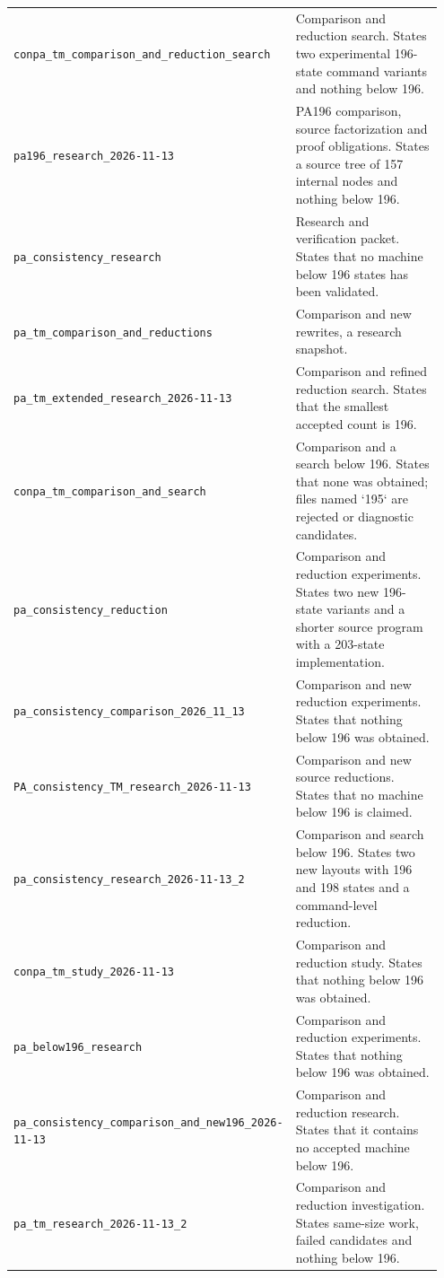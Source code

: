 \begin{longtable}{@{}p{0.40\linewidth}p{0.55\linewidth}@{}}
\nolinkurl{conpa_tm_comparison_and_reduction_search} & Comparison and reduction search. States two experimental 196-state command variants and nothing below 196.\\[4pt]
\nolinkurl{pa196_research_2026-11-13} & PA196 comparison, source factorization and proof obligations. States a source tree of 157 internal nodes and nothing below 196.\\[4pt]
\nolinkurl{pa_consistency_research} & Research and verification packet. States that no machine below 196 states has been validated.\\[4pt]
\nolinkurl{pa_tm_comparison_and_reductions} & Comparison and new rewrites, a research snapshot.\\[4pt]
\nolinkurl{pa_tm_extended_research_2026-11-13} & Comparison and refined reduction search. States that the smallest accepted count is 196.\\[4pt]
\nolinkurl{conpa_tm_comparison_and_search} & Comparison and a search below 196. States that none was obtained; files named `195` are rejected or diagnostic candidates.\\[4pt]
\nolinkurl{pa_consistency_reduction} & Comparison and reduction experiments. States two new 196-state variants and a shorter source program with a 203-state implementation.\\[4pt]
\nolinkurl{pa_consistency_comparison_2026_11_13} & Comparison and new reduction experiments. States that nothing below 196 was obtained.\\[4pt]
\nolinkurl{PA_consistency_TM_research_2026-11-13} & Comparison and new source reductions. States that no machine below 196 is claimed.\\[4pt]
\nolinkurl{pa_consistency_research_2026-11-13_2} & Comparison and search below 196. States two new layouts with 196 and 198 states and a command-level reduction.\\[4pt]
\nolinkurl{conpa_tm_study_2026-11-13} & Comparison and reduction study. States that nothing below 196 was obtained.\\[4pt]
\nolinkurl{pa_below196_research} & Comparison and reduction experiments. States that nothing below 196 was obtained.\\[4pt]
\nolinkurl{pa_consistency_comparison_and_new196_2026-11-13} & Comparison and reduction research. States that it contains no accepted machine below 196.\\[4pt]
\nolinkurl{pa_tm_research_2026-11-13_2} & Comparison and reduction investigation. States same-size work, failed candidates and nothing below 196.\\[4pt]

\end{longtable}
